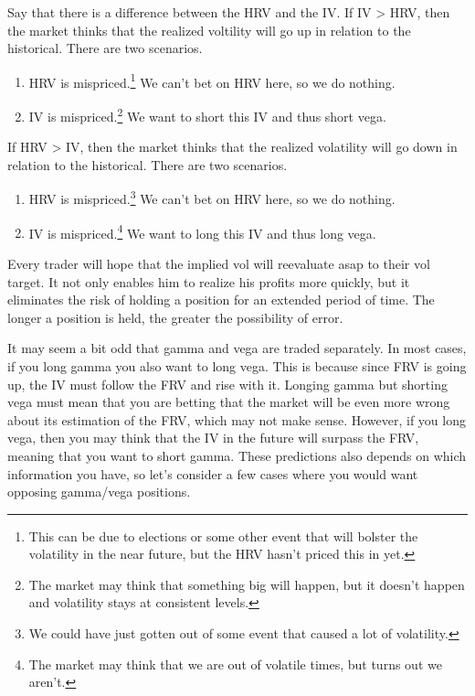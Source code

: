 \documentclass{article}
\begin{document}
    \begin{example}
      Say that there is a difference between the HRV and the IV. If IV > HRV, then the market thinks that the realized voltility will go up in relation to the historical. There are two scenarios.
      \begin{enumerate}
        \item HRV is mispriced.\footnote{This can be due to elections or some other event that will bolster the volatility in the near future, but the HRV hasn't priced this in yet. } We can't bet on HRV here, so we do nothing.
        \item IV is mispriced.\footnote{The market may think that something big will happen, but it doesn't happen and volatility stays at consistent levels. } We want to short this IV and thus short vega.
      \end{enumerate}

      If HRV > IV, then the market thinks that the realized volatility will go down in relation to the historical. There are two scenarios.
      \begin{enumerate}
        \item HRV is mispriced.\footnote{We could have just gotten out of some event that caused a lot of volatility.} We can't bet on HRV here, so we do nothing.
        \item IV is mispriced.\footnote{The market may think that we are out of volatile times, but turns out we aren't.} We want to long this IV and thus long vega.
      \end{enumerate}
      Every trader will hope that the implied vol will reevaluate asap to their vol target. It not only enables him to realize his profits more quickly, but it eliminates the risk of holding a position for an extended period of time. The longer a position is held, the greater the possibility of error.
    \end{example}

    It may seem a bit odd that gamma and vega are traded separately. In most cases, if you long gamma you also want to long vega. This is because since FRV is going up, the IV must follow the FRV and rise with it. Longing gamma but shorting vega must mean that you are betting that the market will be even more wrong about its estimation of the FRV, which may not make sense. However, if you long vega, then you may think that the IV in the future will surpass the FRV, meaning that you want to short gamma. These predictions also depends on which information you have, so let's consider a few cases where you would want opposing gamma/vega positions.
\end{document}
